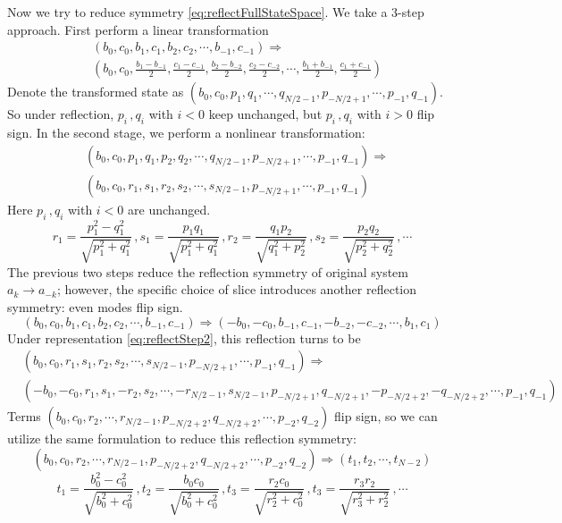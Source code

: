 Now we try to reduce symmetry \eqref{eq:reflectFullStateSpace}. We take a 3-step
approach. First perform a linear transformation
\begin{align}
& (b_0, c_0, b_1, c_1, b_2, c_2, \cdots, b_{-1}, c_{-1})
  \Rightarrow \nonumber \\
& (b_0, c_0, \frac{b_1-b_{-1}}{2}, \frac{c_1-c_{-1}}{2}, \frac{b_2-b_{-2}}{2},
  \frac{c_2-c_{-2}}{2}, \cdots,
  \frac{b_1+b_{-1}}{2}, \frac{c_1+c_{-1}}{2})
  \label{eq:reflectStep1}
\end{align}
Denote the transformed state as
$(b_0, c_0, p_1, q_1, \cdots, q_{N/2-1}, p_{-N/2+1}, \cdots, p_{-1}, q_{-1})$. So under reflection,
$p_i\,,q_i$ with $i<0$ keep unchanged, but $p_i\,,q_i$ with $i>0$ flip sign. In
the second stage, we perform a nonlinear transformation:
\begin{align}
& (b_0, c_0, p_1, q_1, p_2, q_2, \cdots, q_{N/2-1}, p_{-N/2+1}, \cdots, p_{-1}, q_{-1})
  \Rightarrow \nonumber \\
& (b_0, c_0, r_1, s_1, r_2, s_2, \cdots, s_{N/2-1}, p_{-N/2+1}, \cdots, p_{-1}, q_{-1})
  \label{eq:reflectStep2}
\end{align}
Here $p_i\,,q_i$ with $i<0$ are unchanged.
\[
r_1 = \frac{p_1^2-q_1^2}{\sqrt{p_1^2+q_1^2}}\,,
s_1 = \frac{p_1 q_1}{\sqrt{p_1^2+q_1^2}} \,,
r_2 = \frac{q_1 p_2}{\sqrt{q_1^2+p_2^2}} \,,
s_2 = \frac{p_2 q_2}{\sqrt{p_2^2+q_2^2}} \,,
\cdots
\]
The previous two steps reduce the reflection symmetry of original system
$a_k \to a_{-k}$; however, the specific choice of slice
introduces another reflection symmetry: even modes flip sign.
\begin{equation}
(b_0, c_0, b_1, c_1, b_2, c_2, \cdots, b_{-1}, c_{-1})
  \Rightarrow
(-b_0, -c_0, b_{-1}, c_{-1}, -b_{-2}, -c_{-2}, \cdots, b_{1}, c_{1})
  \label{eq:2ndReflection}
\end{equation}
Under representation \eqref{eq:reflectStep2}, this reflection turns to be
\begin{align*}
& (b_0, c_0, r_1, s_1, r_2, s_2, \cdots, s_{N/2-1}, p_{-N/2+1}, \cdots, p_{-1}, q_{-1})
  \Rightarrow \\
& (-b_0, -c_0, r_1, s_1, -r_2, s_2, \cdots, -r_{N/2-1}, s_{N/2-1},
  p_{-N/2+1}, q_{-N/2+1}, -p_{-N/2+2}, -q_{-N/2+2}, \cdots, p_{-1}, q_{-1})
\end{align*}
Terms $(b_0, c_0, r_2, \cdots, r_{N/2-1}, p_{-N/2+2}, q_{-N/2+2}, \cdots, p_{-2}, q_{-2})$
flip sign, so we can
utilize the same formulation to reduce this reflection symmetry:
\begin{equation}
(b_0, c_0, r_2, \cdots, r_{N/2-1}, p_{-N/2+2}, q_{-N/2+2}, \cdots, p_{-2}, q_{-2})
\Rightarrow
(t_1, t_2, \cdots, t_{N-2})
  \label{eq:reduce2ndReflection}
\end{equation}
\[
t_1 = \frac{b_0^2-c_0^2}{\sqrt{b_0^2+c_0^2}}\,,
t_2 = \frac{b_0 c_0}{\sqrt{b_0^2+c_0^2}} \,,
t_3 = \frac{r_2 c_0}{\sqrt{r_2^2+c_0^2}} \,,
t_3 = \frac{r_3 r_2}{\sqrt{r_3^2+r_2^2}} \,,
\cdots
\]

